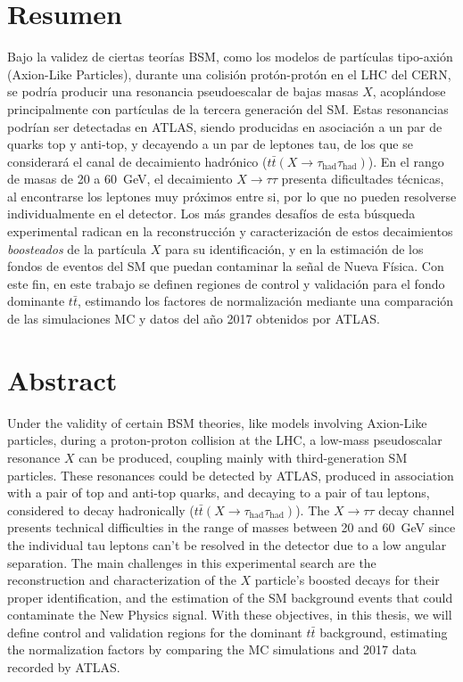 {
\let\clearpage\relax

\chapter*{Resumen}

Bajo la validez de ciertas teorías BSM, como los modelos de partículas tipo-axión (Axion-Like Particles), durante una colisión protón-protón en el LHC del CERN, se podría producir una resonancia pseudoescalar de bajas masas $X$, acoplándose principalmente con partículas de la tercera generación del SM. Estas resonancias podrían ser detectadas en ATLAS, siendo producidas en asociación a un par de quarks top y anti-top, y decayendo a un par de leptones tau, de los que se considerará el canal de decaimiento hadrónico {\large(}$t\bar{t}(X \to \tau_{\text{had}} \tau_{\text{had}})${\large)}. En el rango de masas de \num{20} a \SI{60}{\GeV}, el decaimiento $X \to \tau\tau$ presenta dificultades técnicas, al encontrarse los leptones muy próximos entre si, por lo que no pueden resolverse individualmente en el detector. Los más grandes desafíos de esta búsqueda experimental radican en la reconstrucción y caracterización de estos decaimientos \textit{boosteados} de la partícula $X$ para su identificación, y en la estimación de los fondos de eventos del SM que puedan contaminar la señal de Nueva Física. Con este fin, en este trabajo se definen regiones de control y validación para el fondo dominante $t\bar{t}$, estimando los factores de normalización mediante una comparación de las simulaciones MC y datos del año 2017 obtenidos por ATLAS.


\vfill


\chapter*{Abstract}

Under the validity of certain BSM theories, like models involving Axion-Like particles, during a proton-proton collision at the LHC, a low-mass pseudoscalar resonance $X$ can be produced, coupling mainly with third-generation SM particles. These resonances could be detected by ATLAS, produced in association with a pair of top and anti-top quarks, and decaying to a pair of tau leptons, considered to decay hadronically {\large(}$t\bar{t}(X \to \tau_{\text{had}} \tau_{\text{had}})${\large)}. The $X \to \tau\tau$ decay channel presents technical difficulties in the range of masses between \num{20} and \SI{60}{\GeV} since the individual tau leptons can't be resolved in the detector due to a low angular separation. The main challenges in this experimental search are the reconstruction and characterization of the $X$ particle's boosted decays for their proper identification, and the estimation of the SM background events that could contaminate the New Physics signal. With these objectives, in this thesis, we will define control and validation regions for the dominant $t\bar{t}$ background, estimating the normalization factors by comparing the MC simulations and 2017 data recorded by ATLAS.

\vfill
\vfill
}

\clearpage{}

\cleardoublepage{}